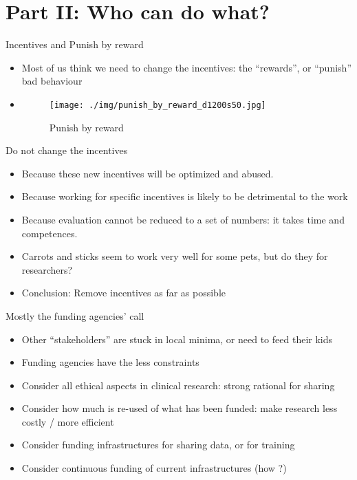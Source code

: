 \documentclass[ignorenonframetext,]{beamer}
\begin{document}
\section{Part II: Who can do what?}\label{part-ii-who-can-do-what}

\begin{frame}{Incentives and Punish by reward}

\begin{itemize}[<+->]
\item
  Most of us think we need to change the incentives: the ``rewards'', or
  ``punish'' bad behaviour
\item
  \begin{figure}[htbp]
  \centering
  \texttt{[image: ./img/punish\_by\_reward\_d1200s50.jpg]}
  \caption{Punish by reward}
  \end{figure}
\end{itemize}

\end{frame}

\begin{frame}{Do not change the incentives}

\begin{itemize}[<+->]
\itemsep1pt\parskip0pt
\item
  Because these new incentives will be optimized and abused.
\item
  Because working for specific incentives is likely to be detrimental to
  the work
\item
  Because evaluation cannot be reduced to a set of numbers: it takes
  time and competences.
\item
  Carrots and sticks seem to work very well for some pets, but do they
  for researchers?
\item
  Conclusion: Remove incentives as far as possible
\end{itemize}

\end{frame}

\begin{frame}{Mostly the funding agencies' call}

\begin{itemize}[<+->]
\itemsep1pt\parskip0pt
\item
  Other ``stakeholders'' are stuck in local minima, or need to feed
  their kids
\item
  Funding agencies have the less constraints
\item
  Consider all ethical aspects in clinical research: strong rational for
  sharing
\item
  Consider how much is re-used of what has been funded: make research
  less costly / more efficient
\item
  Consider funding infrastructures for sharing data, or for training
\item
  Consider continuous funding of current infrastructures (how ?)
\end{itemize}

\end{frame}
\end{document}
